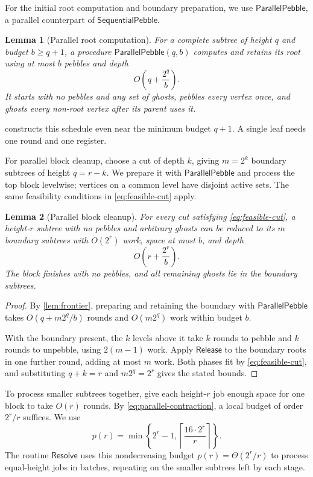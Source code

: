 \documentclass[11pt]{article}
\newtheorem{lemma}[lemma]{Lemma}
\theoremstyle{definition}
\theoremstyle{remark}
\newcommand{\Fast}{\mathsf{SequentialPebble}}
\newcommand{\Release}{\mathsf{Release}}
\newcommand{\Sweep}{\mathsf{ParallelPebble}}
\newcommand{\Resolve}{\mathsf{Resolve}}
\begin{document}
For the initial root computation and boundary preparation, we use $\Sweep$, a parallel counterpart of $\Fast$.

\begin{lemma}[Parallel root computation]
\label{lem:sweep}
For a complete subtree of height $q$ and budget $b\ge q+1$, a procedure $\Sweep(q,b)$ computes and retains its root using at most $b$ pebbles and depth
\begin{equation}
O\!\left(q+\frac{2^q}{b}\right).
\label{eq:sweep}
\end{equation}
It starts with no pebbles and any set of ghosts, pebbles every vertex once, and ghosts every non-root vertex after its parent uses it.
\end{lemma}

 constructs this schedule even near the minimum budget $q+1$. A single leaf needs one round and one register.

For parallel block cleanup, choose a cut of depth $k$, giving $m=2^k$ boundary subtrees of height $q=r-k$. We prepare it with $\Sweep$ and process the top block levelwise; vertices on a common level have disjoint active sets. The same feasibility conditions in \cref{eq:feasible-cut} apply.

\begin{lemma}[Parallel block cleanup]
\label{cor:parallel-contraction}
For every cut satisfying \cref{eq:feasible-cut}, a height-$r$ subtree with no pebbles and arbitrary ghosts can be reduced to its $m$ boundary subtrees with $O(2^r)$ work, space at most $b$, and depth
\begin{equation}
O\!\left(r+\frac{2^r}{b}\right).
\label{eq:parallel-contraction}
\end{equation}
The block finishes with no pebbles, and all remaining ghosts lie in the boundary subtrees.
\end{lemma}
\begin{proof}
By \cref{lem:frontier}, preparing and retaining the boundary with $\Sweep$ takes $O(q+m2^q/b)$ rounds and $O(m2^q)$ work within budget $b$.

With the boundary present, the $k$ levels above it take $k$ rounds to pebble and $k$ rounds to unpebble, using $2(m-1)$ work. Apply $\Release$ to the boundary roots in one further round, adding at most $m$ work. Both phases fit by \cref{eq:feasible-cut}, and substituting $q+k=r$ and $m2^q=2^r$ gives the stated bounds.
\end{proof}

To process smaller subtrees together, give each height-$r$ job enough space for one block to take $O(r)$ rounds. By \cref{eq:parallel-contraction}, a local budget of order $2^r/r$ suffices. We use
\begin{equation}
p(r)=\min\left\{2^r-1,\left\lceil\frac{16\cdot2^r}{r}\right\rceil\right\}.
\label{eq:resolver-space}
\end{equation}
The routine $\Resolve$ uses this nondecreasing budget $p(r)=\Theta(2^r/r)$ to process equal-height jobs in batches, repeating on the smaller subtrees left by each stage.
\end{document}
